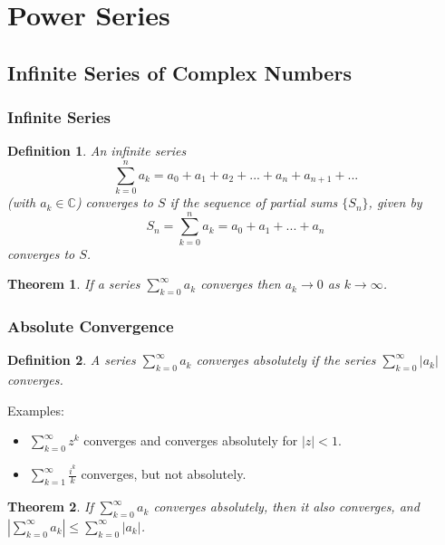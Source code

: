 \documentclass{article}
\newtheorem{theorem}{Theorem}[section]
\newtheorem{definition}{Definition}[section]
\begin{document}
\section{Power Series}

\subsection{Infinite Series of Complex Numbers}

\subsubsection{Infinite Series}
\begin{definition}
An infinite series
\begin{equation*}
\sum_{k=0}^{n} a_k = a_0 + a_1 + a_2 + ... + a_n + a_{n+1} + ...
\end{equation*}
(with $a_k \in \mathbb{C}$) converges to $S$ if the sequence of partial sums $\{S_n\}$, given by 
\begin{equation*}
S_n = \sum_{k=0}^{n}a_k = a_0 + a_1 + ... + a_n
\end{equation*}
converges to $S$.
\end{definition}

\begin{theorem}
If a series $\sum_{k=0}^{\infty} a_k$ converges then $a_k \to 0$ as $k \to \infty$.
\end{theorem}

\subsubsection{Absolute Convergence}
\begin{definition}
A series $\sum_{k=0}^{\infty} a_k$ converges absolutely if the series $\sum_{k=0}^{\infty}\left|a_k\right|$ converges.
\end{definition}
Examples:
\begin{itemize}
\item $\sum_{k=0}^{\infty} z^k$ converges and converges absolutely for $\left|z\right| < 1$.
\item $\sum_{k=1}^{\infty} \frac{i^k}{k}$ converges, but not absolutely.
\end{itemize}
\begin{theorem}
If $\sum_{k=0}^{\infty} a_k$ converges absolutely, then it also converges, and $\left|\sum_{k=0}^{\infty}a_k\right| \leq \sum_{k=0}^{\infty} \left|a_k\right|$.
\end{theorem}
\end{document}
